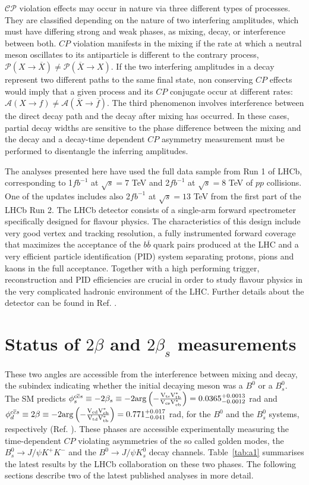 \documentclass[12pt]{article}
\def\CP                {{\ensuremath{C\!P}}\xspace}
\begin{document}
$\mathcal{CP}$ violation effects may occur in nature via three different types of processes. They are classified depending on the nature of two interfering amplitudes, which must have differing strong and weak phases, as mixing, decay, or interference between both. \CP violation manifests in the mixing if the rate at which a neutral meson oscillates to its antiparticle is different to the contrary process, $\mathcal{P}(X\rightarrow \overline{X})\neq\mathcal{P}(\overline{X}\rightarrow X)$. If the two interfering amplitudes in a decay represent two different paths to the same final state, non conserving \CP effects would imply that a given process and its \CP conjugate occur at different rates: $\mathcal{A}(X\rightarrow f) \neq \mathcal{A}(\overline{X} \rightarrow \overline{f})$. The third phenomenon involves interference between the direct decay path and the decay after mixing has occurred. In these cases, partial decay widths are sensitive to the phase difference between the mixing and the decay and a decay-time dependent \CP asymmetry measurement must be performed to disentangle the inferring amplitudes. 

The analyses presented here have used the full data sample from Run 1 of LHCb, corresponding to 1$fb^{-1}$ at $\sqrt{s} = 7$ TeV and 2$fb^{-1}$ at $\sqrt{s} = 8$ TeV of $pp$ collisions. One of the updates includes also 2$fb^{-1}$ at $\sqrt{s} = 13$ TeV from the first part of the LHCb Run 2. The LHCb detector consists of a single-arm forward spectrometer specifically designed for flavour physics. The characteristics of this design include very good vertex and tracking resolution, a fully instrumented forward coverage that maximizes the acceptance of the $b\overline{b}$ quark pairs produced at the LHC and a very efficient particle identification (PID) system separating protons, pions and kaons in the full acceptance. Together with a high performing trigger, reconstruction and PID efficiencies are crucial in order to study flavour physics in the very complicated hadronic environment of the LHC. Further details about the detector can be found in Ref. \cite{lhcb}.


\section{Status of $2\beta$ and $2\beta_s$ measurements}
These two angles are accessible from the interference between mixing and decay, the subindex indicating whether the initial decaying meson was a $B^0$ or a $B^0_s$. The SM predicts $\phi^{c\overline{c}s}_s \equiv -2\beta_s \equiv -2 \rm{arg}\left(-\frac{V_{ts}V^*_{tb}}{V_{cs}V^*_{cb}}\right) = 0.0365^{+0.0013}_{-0.0012}$ rad and $\phi^{c\overline{c}s}_d \equiv 2\beta \equiv -2 \rm{arg}\left(-\frac{V_{cd}V^*_{cb}}{V_{td}V^*_{tb}}\right) = 0.771^{+0.017}_{-0.041}$ rad, for the $B^0$ and the $B^0_s$ systems, respectively (Ref. \cite{CKMfitter}). These phases are accessible experimentally measuring the time-dependent \CP violating asymmetries of the so called golden modes, the $B^0_s\rightarrow J/\psi K^+K^-$ and the $B^0\rightarrow J/\psi K^0_s$ decay channels. Table~\ref{tab:a1} summarises the latest results by the LHCb collaboration on these two phases. The following sections describe two of the latest published analyses in more detail. 
\end{document}
